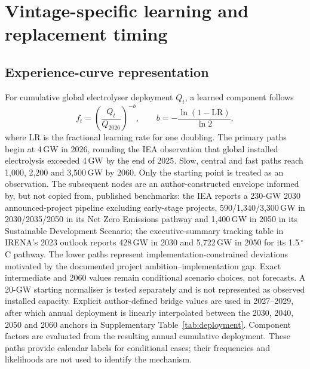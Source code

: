 \documentclass[11pt,a4paper]{article}
\begin{document}
\section{Vintage-specific learning and replacement timing}\label{sec:learning}

\subsection{Experience-curve representation}

For cumulative global electrolyser deployment $Q_t$, a learned component follows
\begin{equation}
f_t=\left(\frac{Q_t}{Q_{2026}}\right)^{-b}, \qquad
b=-\frac{\ln(1-\mathrm{LR})}{\ln 2},
\label{eq:learningcurve}
\end{equation}
where LR is the fractional learning rate for one doubling. The primary paths begin at 4\,GW in 2026, rounding the IEA observation that global installed electrolysis exceeded 4\,GW by the end of 2025\cite{iea2026}. Slow, central and fast paths reach 1,000, 2,200 and 3,500\,GW by 2060. Only the starting point is treated as an observation. The subsequent nodes are an author-constructed envelope informed by, but not copied from, published benchmarks: the IEA reports a 230-GW 2030 announced-project pipeline excluding early-stage projects, 590/1,340/3,300\,GW in 2030/2035/2050 in its Net Zero Emissions pathway and 1,400\,GW in 2050 in its Sustainable Development Scenario; the executive-summary tracking table in IRENA's 2023 outlook reports 428\,GW in 2030 and 5,722\,GW in 2050 for its 1.5\,$^\circ$C pathway\cite{ieaelectrolysers2024,iea2023nze,iea2021minerals,irena2023}. The lower paths represent implementation-constrained deviations motivated by the documented project ambition--implementation gap\cite{odenweller2025}. Exact intermediate and 2060 values remain conditional scenario choices, not forecasts. A 20-GW starting normaliser is tested separately and is not represented as observed installed capacity. Explicit author-defined bridge values are used in 2027--2029, after which annual deployment is linearly interpolated between the 2030, 2040, 2050 and 2060 anchors in Supplementary Table~\ref{tab:deployment}. Component factors are evaluated from the resulting annual cumulative deployment. These paths provide calendar labels for conditional cases; their frequencies and likelihoods are not used to identify the mechanism.
\end{document}
